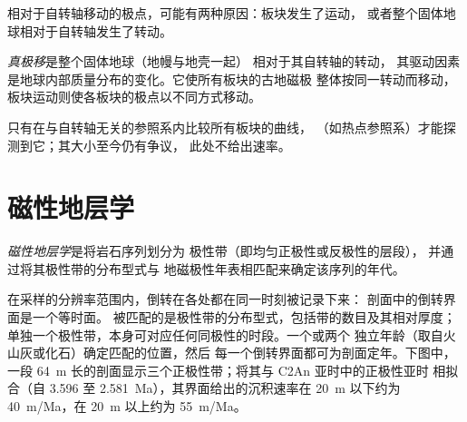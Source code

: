 \begin{omfigure}
\par{}\label{fig:b3:palaeomagnetism:apw}
\end{omfigure}

相对于自转轴移动的极点，可能有两种原因：板块发生了运动，
或者整个固体地球相对于自转轴发生了转动。

\begin{definition}[真极移]\label{def:b3:palaeomagnetism:tpw}
\emph{真极移}是整个固体地球（地幔与地壳一起）
相对于其自转轴的转动，
其驱动因素是地球内部质量分布的变化。它使所有板块的古地磁极
整体按同一转动而移动，
板块运动则使各板块的极点以不同方式移动。
\end{definition}

只有在与自转轴无关的参照系内比较所有板块的曲线，
（如热点参照系）才能探测到它；其大小至今仍有争议，
此处不给出速率。

\section{磁性地层学}

\begin{definition}[磁性地层学]\label{def:b3:palaeomagnetism:magnetostratigraphy}
\emph{磁性地层学}是将岩石序列划分为
极性带（即均匀正极性或反极性的层段），
并通过将其极性带的分布型式与
地磁极性年表相匹配来确定该序列的年代。
\end{definition}

在采样的分辨率范围内，倒转在各处都在同一时刻被记录下来：
剖面中的倒转界面是一个等时面。
被匹配的是极性带的分布型式，包括带的数目及其相对厚度；
单独一个极性带，本身可对应任何同极性的时段。一个或两个
独立年龄（取自火山灰或化石）确定匹配的位置，然后
每一个倒转界面都可为剖面定年。下图中，一段
\qty{64}{m} 长的剖面显示三个正极性带；将其与 C2An 亚时中的正极性亚时
相拟合（自 3.596 至 \qty{2.581}{Ma}），其界面给出的沉积速率在
\qty{20}{m} 以下约为 \qty{40}{m/Ma}，在 \qty{20}{m} 以上约为 \qty{55}{m/Ma}。

